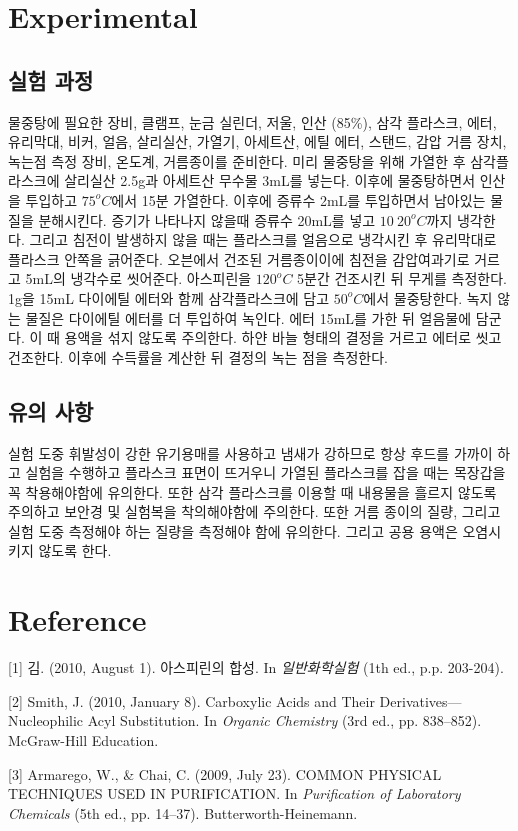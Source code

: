 \documentclass[%
 reprint,
 amsmath,amssymb,
 aps,
]{revtex4-2}
\begin{document}
\section{\label{sec:level1}Experimental}
\subsection{\label{sec:level2}실험 과정}
물중탕에 필요한 장비, 클램프, 눈금 실린더, 저울, 인산 (85\%), 삼각 플라스크, 에터, 유리막대, 비커, 얼음, 살리실산, 가열기, 아세트산, 에틸 에터, 스탠드, 감압 거름 장치, 녹는점 측정 장비, 온도계, 거름종이를 준비한다. 미리 물중탕을 위해 가열한 후 삼각플라스크에  살리실산 2.5g과 아세트산 무수물 3mL를 넣는다. 이후에 물중탕하면서 인산을 투입하고 $75^{o}C$에서 15분 가열한다. 이후에 증류수 2mL를 투입하면서 남아있는 물질을 분해시킨다. 증기가 나타나지 않을때 증류수 20mL를 넣고 $10~20^{o}C$까지 냉각한다. 그리고 침전이 발생하지 않을 때는 플라스크를 얼음으로 냉각시킨 후 유리막대로 플라스크 안쪽을 긁어준다. 오븐에서 건조된 거름종이이에 침전을 감압여과기로 거르고  5mL의 냉각수로 씻어준다. 아스피린을 $120^{o}C$ 5분간 건조시킨 뒤 무게를 측정한다. 1g을 15mL 다이에틸 에터와 함께 삼각플라스크에 담고 $50^{o}C$에서 물중탕한다. 녹지 않는 물질은 다이에틸 에터를 더 투입하여 녹인다. 에터 15mL를 가한 뒤 얼음물에 담군다. 이 때 용액을 섞지 않도록 주의한다. 하얀 바늘 형태의 결정을 거르고 에터로 씻고 건조한다. 이후에 수득률을 계산한 뒤 결정의 녹는 점을 측정한다. 

\subsection{\label{sec:level2}유의 사항}
실험 도중 휘발성이 강한 유기용매를 사용하고 냄새가 강하므로 항상 후드를 가까이 하고 실험을 수행하고 플라스크 표면이 뜨거우니 가열된 플라스크를 잡을 때는 목장갑을 꼭 착용해야함에 유의한다. 또한 삼각 플라스크를 이용할 때 내용물을 흘르지 않도록 주의하고 보안경 및 실험복을 착의해야함에 주의한다. 또한 거름 종이의 질량, 그리고 실험 도중 측정해야 하는 질량을 측정해야 함에 유의한다. 그리고 공용 용액은 오염시키지 않도록 한다.

\section{\label{sec:level1}Reference}
[1] 김. (2010, August 1). 아스피린의 합성. In \textit{일반화학실험} (1th ed., p.p. 203-204).

[2] Smith, J. (2010, January 8). Carboxylic Acids and Their Derivatives—Nucleophilic Acyl Substitution. In \textit{Organic Chemistry} (3rd ed., pp. 838–852). McGraw-Hill Education.

[3] Armarego, W., \& Chai, C. (2009, July 23). COMMON PHYSICAL TECHNIQUES USED IN PURIFICATION. In \textit{Purification of Laboratory Chemicals} (5th ed., pp. 14–37). Butterworth-Heinemann.
\end{document}
